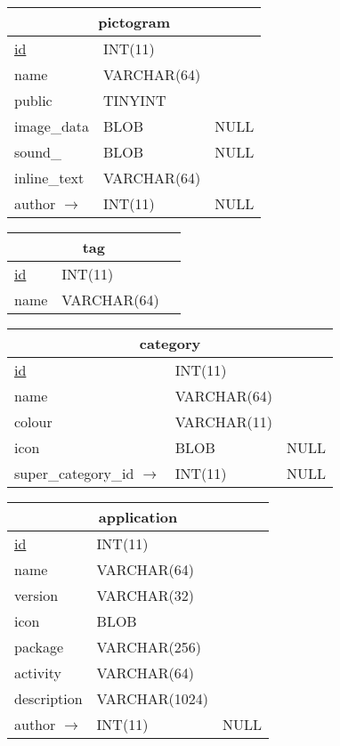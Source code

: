 \vspace{10pt}

\begin{tabular}{|l|l|c|}
\hline
\multicolumn{3}{|c|}{pictogram} \\
\hline
\underline{id} & INT(11) & \\
name & VARCHAR(64) & \\
public & TINYINT & \\
image\_data & BLOB & NULL \\
sound\_ & BLOB & NULL \\
inline\_text & VARCHAR(64) & \\
author $ \rightarrow $ & INT(11) & NULL \\
\hline
\end{tabular}

\vspace{10pt}

\begin{tabular}{|l|l|c|}
\hline
\multicolumn{3}{|c|}{tag} \\
\hline
\underline{id} & INT(11) & \\
name & VARCHAR(64) & \\
\hline
\end{tabular}

\vspace{10pt}

\begin{tabular}{|l|l|c|}
\hline
\multicolumn{3}{|c|}{category} \\
\hline
\underline{id} & INT(11) & \\
name & VARCHAR(64) & \\
colour & VARCHAR(11) & \\
icon & BLOB & NULL \\
super\_category\_id $ \rightarrow $ & INT(11) & NULL\\
\hline
\end{tabular}

\vspace{10pt}

\begin{tabular}{|l|l|c|}
\hline
\multicolumn{3}{|c|}{application} \\
\hline
\underline{id} & INT(11) & \\
name & VARCHAR(64) & \\
version & VARCHAR(32) & \\
icon & BLOB & \\
package & VARCHAR(256) & \\
activity & VARCHAR(64) & \\ 
description & VARCHAR(1024) & \\
author $ \rightarrow $ & INT(11) & NULL \\
\hline
\end{tabular}


